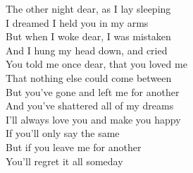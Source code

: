 \documentclass[letterpaper,9pt]{article}
\begin{document}
The other night dear, as  I lay sleeping \\
I dreamed I held you in my arms \\
But when I woke dear, I was mistaken \\
And I hung my head down, and cried \\

You told me once dear, that you loved me \\
That nothing else could come between \\
But you've gone and left me for another \\
And you've shattered all of my dreams \\

I'll always love you and make you happy \\
If you'll only say the same \\
But if you leave me for another \\
You'll regret it all someday \\
\end{document}
